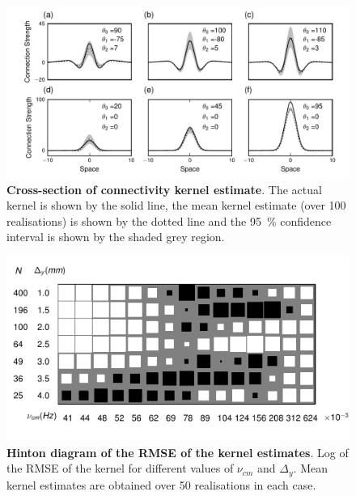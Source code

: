 \documentclass[12pt]{iopart}
\begin{document}
\begin{figure}[!ht]
\begin{center}
\includegraphics{./Graph/pdf/Figure8_1.pdf}
\end{center}
\caption{{\bf Cross-section of connectivity kernel estimate}. The actual kernel is shown by the solid line, the mean kernel estimate (over 100 realisations) is shown by the dotted line and the 95~\% confidence interval is shown by the shaded grey region.}
\label{fig:Figure8}
\end{figure}



\begin{figure}[!ht]
\begin{center}
\includegraphics{./Graph/pdf/Figure11.pdf}
\end{center}
\caption{{\bf Hinton diagram of the RMSE of the kernel estimates}. Log of the RMSE of the kernel for different values of $\nu_{cm}$ and $\Delta_y$. Mean kernel estimates are obtained over 50 realisations in each case.}
\label{fig:Figure11}
\end{figure}
\end{document}
